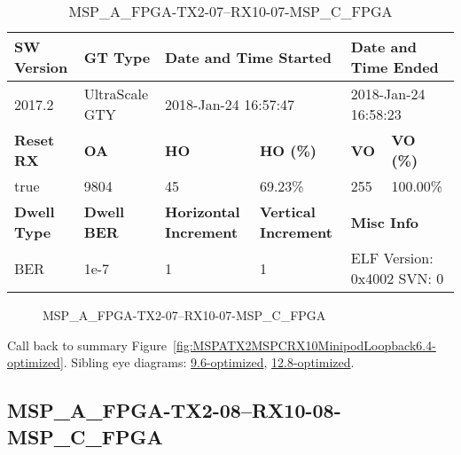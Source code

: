 \begin{table}[h]
\centering
\caption{MSP\_A\_FPGA-TX2-07--RX10-07-MSP\_C\_FPGA}
\label{tab:MSPAFPGATX207RX1007MSPCFPGA6.4-optimized}
\begin{tabular}{@{}|l|l|l|l|l|l|@{}}
\toprule
\textbf{SW Version}                & \textbf{GT Type}   & \multicolumn{2}{l|}{\textbf{Date and Time Started}}            & \multicolumn{2}{l|}{\textbf{Date and Time Ended}}        \\ \midrule
2017.2                       & UltraScale GTY          & \multicolumn{2}{l|}{2018-Jan-24 16:57:47}                   & \multicolumn{2}{l|}{2018-Jan-24 16:58:23}               \\ \midrule
\textbf{Reset RX}                  & \textbf{OA} & \textbf{HO}   & \textbf{HO (\%)} & \textbf{VO} & \textbf{VO (\%)} \\ \midrule
true & 9804        & 45          & 69.23\%        & 255        & 100.00\%       \\ \midrule
\textbf{Dwell Type}                & \textbf{Dwell BER} & \textbf{Horizontal Increment} & \textbf{Vertical Increment}    & \multicolumn{2}{l|}{\textbf{Misc Info}}                  \\ \midrule
BER                            & 1e-7        & 1        & 1           & \multicolumn{2}{l|}{ELF Version: 0x4002 SVN: 0}                         \\ \bottomrule
\end{tabular}
\end{table}

\begin{figure}[h]
\caption{MSP\_A\_FPGA-TX2-07--RX10-07-MSP\_C\_FPGA} \label{fig:MSPAFPGATX207RX1007MSPCFPGA6.4-optimized}
\end{figure}

Call back to summary Figure~\ref{fig:MSPATX2MSPCRX10MinipodLoopback6.4-optimized}.
Sibling eye diagrams: \hyperref[sec:MSPAFPGATX207RX1007MSPCFPGA9.6-optimized]{9.6-optimized}, \hyperref[sec:MSPAFPGATX207RX1007MSPCFPGA12.8-optimized]{12.8-optimized}.

\clearpage
\newpage


\subsection{MSP\_A\_FPGA-TX2-08--RX10-08-MSP\_C\_FPGA}\label{sec:MSPAFPGATX208RX1008MSPCFPGA6.4-optimized}

